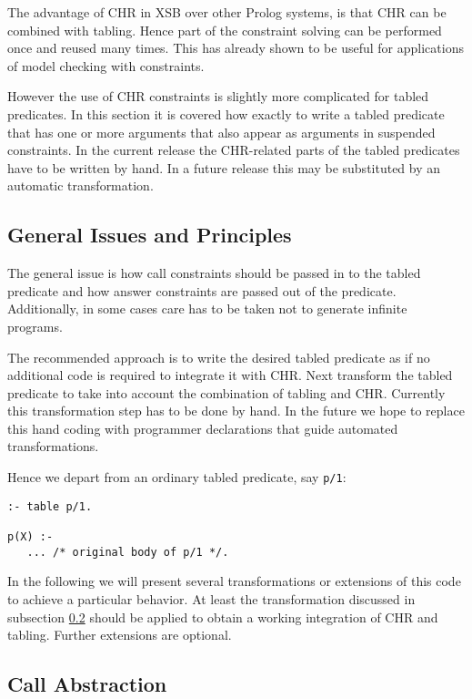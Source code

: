 The advantage of CHR in XSB over other Prolog systems, is that CHR can be
combined with tabling. Hence part of the constraint solving can be performed
once and reused many times. This has already shown to be useful for applications
of model checking with constraints.

However the use of CHR constraints is slightly more complicated for tabled
predicates.  In this section it is covered how exactly to write a tabled
predicate that has one or more arguments that also appear as arguments in
suspended constraints. In the current release the CHR-related parts of the
tabled predicates have to be written by hand. In a future release this may
be substituted by an automatic transformation.

\subsection{General Issues and Principles}

The general issue is how call constraints should be passed in to the tabled
predicate and how answer constraints are passed out of the predicate. Additionally,
in some cases care has to be taken not to generate infinite programs.

The recommended approach is to write the desired tabled predicate as if
no additional code is required to integrate it with CHR.  Next transform
the tabled predicate to take into account the combination of tabling and
CHR. Currently this transformation step has to be done by hand. In the future
we hope to replace this hand coding with programmer declarations that guide
automated transformations.

Hence we depart from an ordinary tabled predicate, say \texttt{p/1}:

\begin{small}
\begin{verbatim}
:- table p/1.

p(X) :- 
   ... /* original body of p/1 */.
\end{verbatim}
\end{small}

In the following we will present several transformations or extensions of
this code to achieve a particular behavior. At least the transformation
discussed in subsection \ref{abstraction} should be applied to obtain a
working integration of CHR and tabling. Further extensions are optional.

\subsection{Call Abstraction} \label{abstraction}

